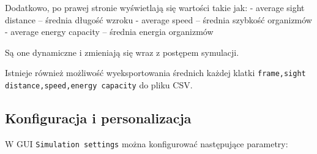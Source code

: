 \documentclass[a4paper]{article}
\begin{document}
Dodatkowo, po prawej stronie wyświetlają się wartości takie jak: -
average sight distance -- średnia długość wzroku - average speed --
średnia szybkość organizmów - average energy capacity -- średnia energia
organizmów

Są one dynamiczne i zmieniają się wraz z postępem symulacji.

Istnieje również możliwość wyeksportowania średnich każdej klatki
\texttt{frame,sight distance,speed,energy capacity} do pliku CSV.

\subsection{Konfiguracja i
personalizacja}\label{konfiguracja-i-personalizacja}

W GUI \texttt{Simulation settings} można konfigurować następujące
parametry:
\end{document}
